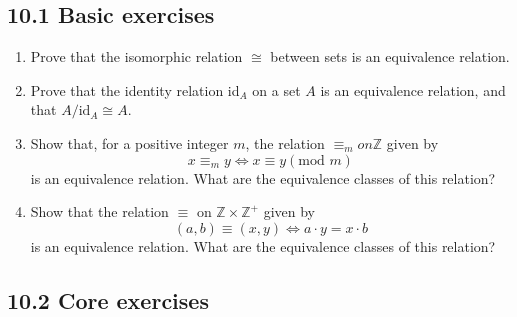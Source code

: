 \documentclass[10pt,\jkfside,a4paper]{article}
\begin{document}
\subsection*{10.1 Basic exercises}

\begin{enumerate}

\item Prove that the isomorphic relation $\cong$ between sets is an equivalence relation.



\item Prove that the identity relation id$_A$ on a set $A$ is an equivalence relation, and that $A/\text{id}_A \cong A$.



\item Show that, for a positive integer $m$, the relation $\equiv_m on \mathbb{Z}$ given by 
\begin{equation}
x \equiv_m y \Longleftrightarrow x \equiv y (\text{mod } m)
\end{equation}
is an equivalence relation. What are the equivalence classes of this relation?



\item Show that the relation $\equiv$ on $\mathbb{Z} \times \mathbb{Z}^+$ given by
\begin{equation}
(a, b) \equiv (x, y) \Longleftrightarrow a \cdot y = x \cdot b
\end{equation}
is an equivalence relation. What are the equivalence classes of this relation?



\end{enumerate}

\subsection*{10.2 Core exercises}
\end{document}
